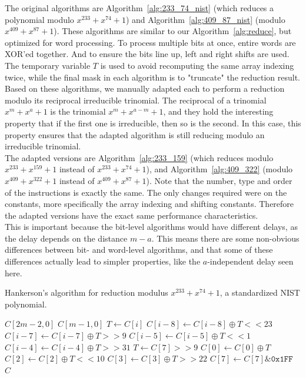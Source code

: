 The original algorithms are Algorithm~\ref{alg:233_74_nist} (which reduces a polynomial modulo $x^{233} + x^{74} + 1$) and Algorithm~\ref{alg:409_87_nist} (modulo $x^{409} + x^{87} + 1$). These algorithms are similar to our Algorithm~\ref{alg:reduce}, but optimized for word processing. To process multiple bits at once, entire words are XOR'ed together. And to ensure the bits line up, left and right shifts are used. The temporary variable $T$ is used to avoid recomputing the same array indexing twice, while the final mask in each algorithm is to "truncate" the reduction result. \\

Based on these algorithms, we manually adapted each to perform a reduction modulo its reciprocal irreducible trinomial. The reciprocal of a trinomial $x^m + x^a +1$ is the trinomial $x^m + x^{a-m} + 1$, and they hold the interesting property that if the first one is irreducible, then so is the second. In this case, this property ensures that the adapted algorithm is still reducing modulo an irreducible trinomial. \\

The adapted versions are Algorithm~\ref{alg:233_159} (which reduces modulo $x^{233} + x^{159} + 1$ instead of $x^{233} + x^{74} + 1$), and Algorithm~\ref{alg:409_322} (modulo $x^{409} + x^{322} + 1$ instead of $x^{409} + x^{87} + 1$). Note that the number, type and order of the instructions is exactly the same. The only changes required were on the constants, more specifically the array indexing and shifting constants. Therefore the adapted versions have the exact same performance characteristics. \\

This is important because the bit-level algorithms would have different delays, as the delay depends on the distance $m-a$. This means there are some non-obvious differences between bit- and word-level algorithms, and that some of these differences actually lead to simpler properties, like the $a$-independent delay seen here. \\

\begin{algorithm}
  \caption{Hankerson's algorithm for reduction modulus $x^{233} + x^{74} + 1$, a standardized NIST polynomial.}
  \label{alg:233_74_nist}
\begin{algorithmic}[1]
  \REQUIRE $C[2m-2,0]$
  \ENSURE $C[m-1,0]$
    \STATE $T \gets C[i]$
    \STATE $C[i-8] \gets C[i-8] \oplus T << 23$
    \STATE $C[i-7] \gets C[i-7] \oplus T >> 9$
    \STATE $C[i-5] \gets C[i-5] \oplus T << 1$
    \STATE $C[i-4] \gets C[i-4] \oplus T >> 31$
  \ENDFOR
  \STATE $T \gets C[7] >> 9$
  \STATE $C[0] \gets C[0] \oplus T$
  \STATE $C[2] \gets C[2] \oplus T << 10$
  \STATE $C[3] \gets C[3] \oplus T >> 22$
  \STATE $C[7] \gets C[7] \& \texttt{0x1FF}$
  \RETURN $C$
\end{algorithmic}
\end{algorithm}

